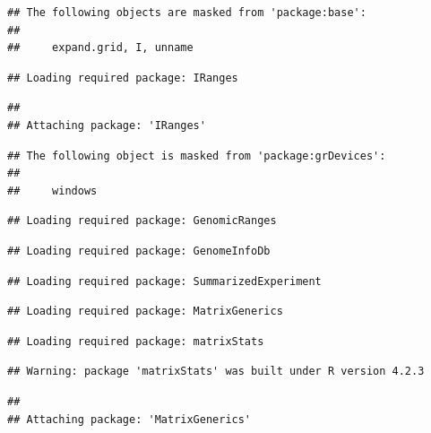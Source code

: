 \documentclass[
]{article}
\begin{document}
\begin{verbatim}
## The following objects are masked from 'package:base':
## 
##     expand.grid, I, unname
\end{verbatim}

\begin{verbatim}
## Loading required package: IRanges
\end{verbatim}

\begin{verbatim}
## 
## Attaching package: 'IRanges'
\end{verbatim}

\begin{verbatim}
## The following object is masked from 'package:grDevices':
## 
##     windows
\end{verbatim}

\begin{verbatim}
## Loading required package: GenomicRanges
\end{verbatim}

\begin{verbatim}
## Loading required package: GenomeInfoDb
\end{verbatim}

\begin{verbatim}
## Loading required package: SummarizedExperiment
\end{verbatim}

\begin{verbatim}
## Loading required package: MatrixGenerics
\end{verbatim}

\begin{verbatim}
## Loading required package: matrixStats
\end{verbatim}

\begin{verbatim}
## Warning: package 'matrixStats' was built under R version 4.2.3
\end{verbatim}

\begin{verbatim}
## 
## Attaching package: 'MatrixGenerics'
\end{verbatim}
\end{document}
